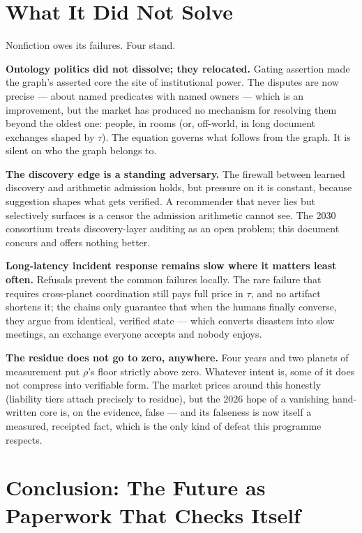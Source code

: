 \documentclass[11pt,a4paper]{report}
\theoremstyle{definition}
\theoremstyle{remark}
\newcommand{\lat}{\tau}
\begin{document}
\chapter{What It Did Not Solve}

Nonfiction owes its failures. Four stand.

\textbf{Ontology politics did not dissolve; they relocated.} Gating
assertion made the graph's asserted core the site of institutional power.
The disputes are now precise --- about named predicates with named owners
--- which is an improvement, but the market has produced no mechanism for
resolving them beyond the oldest one: people, in rooms (or, off-world, in
long document exchanges shaped by $\lat$). The equation governs what
follows from the graph. It is silent on who the graph belongs to.

\textbf{The discovery edge is a standing adversary.} The firewall between
learned discovery and arithmetic admission holds, but pressure on it is
constant, because suggestion shapes what gets verified. A recommender
that never lies but selectively surfaces is a censor the admission
arithmetic cannot see. The 2030 consortium treats discovery-layer
auditing as an open problem; this document concurs and offers nothing
better.

\textbf{Long-latency incident response remains slow where it matters
least often.} Refusals prevent the common failures locally. The rare
failure that requires cross-planet coordination still pays full price in
$\lat$, and no artifact shortens it; the chains only guarantee that when
the humans finally converse, they argue from identical, verified state ---
which converts disasters into slow meetings, an exchange everyone accepts
and nobody enjoys.

\textbf{The residue does not go to zero, anywhere.} Four years and two
planets of measurement put $\rho$'s floor strictly above zero. Whatever
intent is, some of it does not compress into verifiable form. The market
prices around this honestly (liability tiers attach precisely to residue),
but the 2026 hope of a vanishing hand-written core is, on the evidence,
false --- and its falseness is now itself a measured, receipted fact,
which is the only kind of defeat this programme respects.

\chapter{Conclusion: The Future as Paperwork That Checks Itself}
\end{document}
